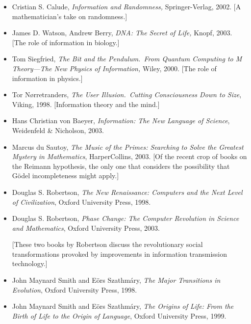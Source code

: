 \documentclass[12pt]{book}
\begin{document}
\begin{itemize}
[A physicist's take on randomness.]
\item
Cristian S. Calude, \emph{Information and Randomness,} 
Springer-Verlag, 2002.
[A mathematician's take on randomness.]
\item
James D. Watson, Andrew Berry, \emph{DNA: The Secret of Life,} Knopf, 2003.
[The role of information in biology.]
\item
Tom Siegfried, \emph{The Bit and the Pendulum.\ From Quantum Computing to M Theory---The
New Physics of Information,} Wiley, 2000.
[The role of information in physics.]
\item
Tor N{\o}rretranders, \emph{The User Illusion.\ Cutting Consciousness Down to Size}, Viking, 1998.
[Information theory and the mind.]
\item
Hans Christian von Baeyer, \emph{Information: The New Language of Science}, 
Weidenfeld \& Nicholson, 2003. 
\item
Marcus du Sautoy, \emph{The Music of the Primes: Searching to Solve the Greatest Mystery in
Mathematics}, HarperCollins, 2003. [Of the recent crop of books on the Reimann
hypothesis, the only one that considers the possibility that G\"odel incompleteness
might apply.]
\item
Douglas S. Robertson, \emph{The New Renaissance: Computers and the Next Level of Civilization},
Oxford University Press, 1998.
\item
Douglas S. Robertson, \emph{Phase Change: The Computer Revolution in Science and Mathematics},
Oxford University Press, 2003. 
 
[These two books by Robertson discuss the 
revolutionary social transformations provoked by improvements in information transmission technology.]
\item
John Maynard Smith and E\"ors Szathm\'ary,
\emph{The Major Transitions in Evolution},
Oxford University Press, 1998.
\item
John Maynard Smith and E\"ors Szathm\'ary,
\emph{The Origins of Life: From the Birth of Life to the Origin of Language},
Oxford University Press, 1999.
 

\end{itemize}
\end{document}
